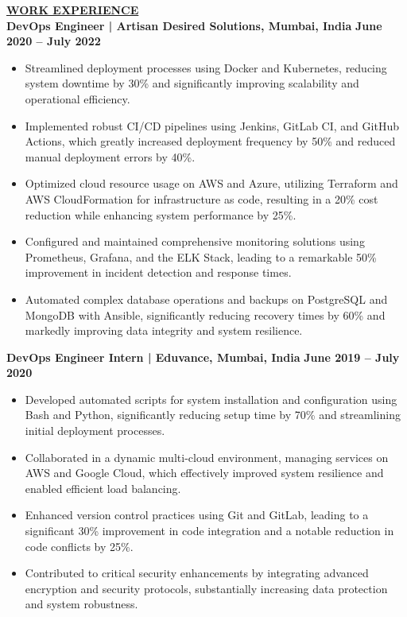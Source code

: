 \documentclass{article}
\begin{document}
\noindent \textbf{\underline{WORK EXPERIENCE}} \\
\noindent \textbf{DevOps Engineer | Artisan Desired Solutions, Mumbai, India}  \hfill \textbf{June 2020 – July 2022}
\begin{itemize}[noitemsep,nolistsep,leftmargin=*]
\item {\small Streamlined deployment processes using Docker and Kubernetes, reducing system downtime by 30\% and significantly improving scalability and operational efficiency.}
\item {\small Implemented robust CI/CD pipelines using Jenkins, GitLab CI, and GitHub Actions, which greatly increased deployment frequency by 50\% and reduced manual deployment errors by 40\%.}
\item {\small Optimized cloud resource usage on AWS and Azure, utilizing Terraform and AWS CloudFormation for infrastructure as code, resulting in a 20\% cost reduction while enhancing system performance by 25\%.}
\item {\small Configured and maintained comprehensive monitoring solutions using Prometheus, Grafana, and the ELK Stack, leading to a remarkable 50\% improvement in incident detection and response times.}
\item {\small Automated complex database operations and backups on PostgreSQL and MongoDB with Ansible, significantly reducing recovery times by 60\% and markedly improving data integrity and system resilience.}
\end{itemize}
\vspace{1mm}

\noindent \textbf{DevOps Engineer Intern | Eduvance, Mumbai, India}  \hfill \textbf{June 2019 – July 2020}
\begin{itemize}[noitemsep,nolistsep,leftmargin=*]
\item {\small Developed automated scripts for system installation and configuration using Bash and Python, significantly reducing setup time by 70\% and streamlining initial deployment processes.}
\item {\small Collaborated in a dynamic multi-cloud environment, managing services on AWS and Google Cloud, which effectively improved system resilience and enabled efficient load balancing.}
\item {\small Enhanced version control practices using Git and GitLab, leading to a significant 30\% improvement in code integration and a notable reduction in code conflicts by 25\%.}
\item {\small Contributed to critical security enhancements by integrating advanced encryption and security protocols, substantially increasing data protection and system robustness.}
\end{itemize}
\end{document}
